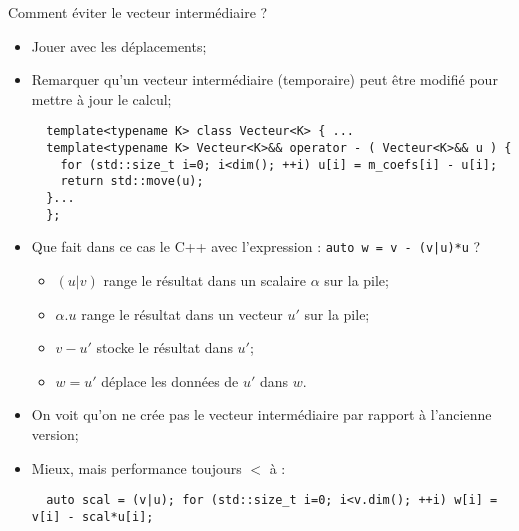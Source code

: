 \documentclass[compress,10pt,aspectratio=169]{beamer}
\begin{document}
  \begin{frame}[fragile]{Comment éviter le vecteur intermédiaire ?}
  \scriptsize\vspace*{-4mm}
  
  \begin{itemize}
  \item Jouer avec les déplacements;
  \item Remarquer qu'un vecteur intermédiaire (temporaire) peut être modifié
        pour mettre à jour le calcul;
  \begin{verbatim}
  template<typename K> class Vecteur<K> { ...
  template<typename K> Vecteur<K>&& operator - ( Vecteur<K>&& u ) {
    for (std::size_t i=0; i<dim(); ++i) u[i] = m_coefs[i] - u[i];
    return std::move(u);
  }...
  };
  \end{verbatim}
  \item Que fait dans ce cas le C++ avec l'expression : \texttt{auto w = v - (v|u)*u} ?
  \begin{itemize}
  \scriptsize 
  \item $(u|v)$ range le résultat dans un scalaire $\alpha$ sur la pile;
  \item $\alpha.u$ range le résultat dans un vecteur $u'$ sur la pile;
  \item $v-u'$ stocke le résultat dans  $u'$;
  \item $w=u'$ déplace les données de $u'$ dans $w$.
  \end{itemize}
  \item On voit qu'on ne crée pas le vecteur intermédiaire par rapport à l'ancienne version;
  \item Mieux, mais performance toujours $<$ à :
  \begin{verbatim}
  auto scal = (v|u); for (std::size_t i=0; i<v.dim(); ++i) w[i] = v[i] - scal*u[i];
  \end{verbatim}
  \end{itemize}
  \end{frame}
  
\end{document}
